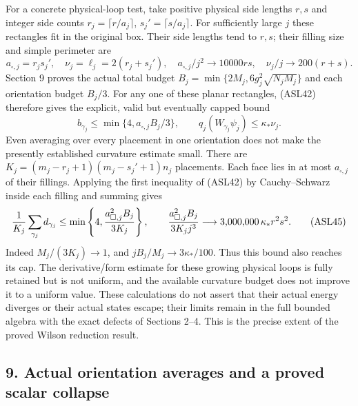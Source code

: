 \documentclass[11pt]{article}
\begin{document}
For a concrete physical-loop test, take positive physical side lengths \(r,s\) and integer side counts \(r_j=\lceil r/a_j\rceil\), \(s_j'=\lceil s/a_j\rceil\). For sufficiently large \(j\) these rectangles fit in the original box. Their side lengths tend to \(r,s\); their filling size and simple perimeter are
\[
 a_{\square,j}=r_js_j',\quad \nu_j=\ell_j=2(r_j+s_j'),\quad
 a_{\square,j}/j^2\longrightarrow10000rs,\quad
 \nu_j/j\longrightarrow200(r+s).
 \tag{ASL43}
\]
Section 9 proves the actual total budget \(B_j=\min\{2M_j,6g_j^2\sqrt{N_jM_j}\}\) and each orientation budget \(B_j/3\). For any one of these planar rectangles, (ASL42) therefore gives the explicit, valid but eventually capped bound
\[
 b_{\gamma_j}\le\min\{4,a_{\square,j}B_j/3\},\qquad
 q_j(W_{\gamma_j}\psi_j)\le\kappa_*\nu_j.
 \tag{ASL44}
\]
Even averaging over every placement in one orientation does not make the presently established curvature estimate small. There are
\(K_j=(m_j-r_j+1)(m_j-s_j'+1)n_j\) placements. Each face lies in at most \(a_{\square,j}\) of their fillings. Applying the first inequality of (ASL42) by Cauchy–Schwarz inside each filling and summing gives
\[
 {1\over K_j}\sum_{\gamma_j}d_{\gamma_j}
 \le\min\left\{4,{a_{\square,j}^2 B_j\over3K_j}\right\},\qquad
 {a_{\square,j}^2 B_j\over3K_jj^3}
 \longrightarrow3{,}000{,}000\,\kappa_*r^2s^2.
 \tag{ASL45}
\]
Indeed \(M_j/(3K_j)\to1\), and \(jB_j/M_j\to3\kappa_*/100\). Thus this bound also reaches its cap. The derivative/form estimate for these growing physical loops is fully retained but is not uniform, and the available curvature budget does not improve it to a uniform value. These calculations do not assert that their actual energy diverges or their actual states escape; their limits remain in the full bounded algebra with the exact defects of Sections 2–4. This is the precise extent of the proved Wilson reduction result.

\subsection*{9. Actual orientation averages and a proved scalar collapse}
\end{document}
